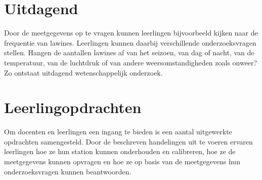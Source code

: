 \section{Uitdagend}

Door de meetgegevens op te vragen kunnen leerlingen bijvoorbeeld kijken
naar de frequentie van lawines.  Leerlingen kunnen daarbij verschillende
onderzoeksvragen stellen. Hangen de aantallen lawines af van het
seizoen, van dag of nacht, van de temperatuur, van de luchtdruk of van
andere weersomstandigheden zoals onweer? Zo ontstaat uitdagend
wetenschappelijk onderzoek. 


\section{Leerlingopdrachten}

Om docenten en leerlingen een ingang te bieden is een aantal
uitgewerkte opdrachten samengesteld. Door de beschreven handelingen uit
te voeren ervaren leerlingen hoe ze hun \hisparc station kunnen
onderhouden en calibreren, hoe ze de meetgegevens kunnen opvragen en hoe
ze op basis van de meetgegevens hun onderzoeksvragen kunnen beantwoorden.


